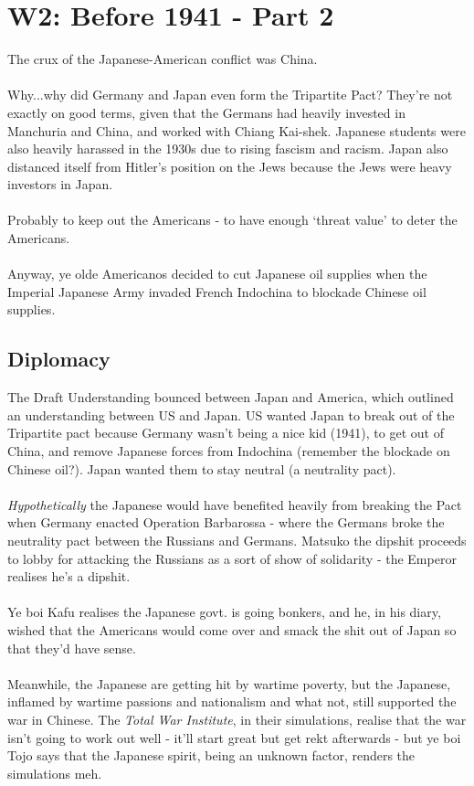 \documentclass[a4paper]{article}
\begin{document}
\section{W2: Before 1941 - Part 2}
The crux of the Japanese-American conflict was China.\\
\\
Why...why did Germany and Japan even form the Tripartite Pact? They're not exactly on good terms, given that the Germans had heavily invested in Manchuria and China, and worked with Chiang Kai-shek. Japanese students were also heavily harassed in the 1930s due to rising fascism and racism. Japan also distanced itself from Hitler's position on the Jews because the Jews were heavy investors in Japan.\\
\\
Probably to keep out the Americans - to have enough `threat value' to deter the Americans.\\
\\
Anyway, ye olde Americanos decided to cut Japanese oil supplies when the Imperial Japanese Army invaded French Indochina to blockade Chinese oil supplies.
\subsection{Diplomacy}
The Draft Understanding bounced between Japan and America, which outlined an understanding between US and Japan. US wanted Japan to break out of the Tripartite pact because Germany wasn't being a nice kid (1941), to get out of China, and remove Japanese forces from Indochina (remember the blockade on Chinese oil?). Japan wanted them to stay neutral (a neutrality pact).\\
\\
\textit{Hypothetically} the Japanese would have benefited heavily from breaking the Pact when Germany enacted Operation Barbarossa - where the Germans broke the neutrality pact between the Russians and Germans. Matsuko the dipshit proceeds to lobby for attacking the Russians as a sort of show of solidarity - the Emperor realises he's a dipshit.\\
\\
Ye boi Kafu realises the Japanese govt. is going bonkers, and he, in his diary, wished that the Americans would come over and smack the shit out of Japan so that they'd have sense.\\
\\
Meanwhile, the Japanese are getting hit by wartime poverty, but the Japanese, inflamed by wartime passions and nationalism and what not, still supported the war in Chinese. The \textit{Total War Institute}, in their simulations, realise that the war isn't going to work out well - it'll start great but get rekt afterwards - but ye boi Tojo says that the Japanese spirit, being an unknown factor, renders the simulations meh.
\end{document}
